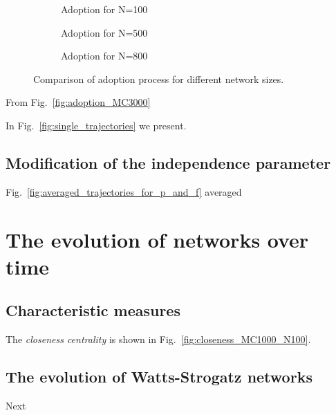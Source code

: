 \documentclass[a4paper,12pt,twoside]{report} %
\begin{document}
\begin{figure}[H]
\centering
	\begin{subfigure}[b]{0.49\textwidth}
           \centering
            \caption{Adoption for N=100}   
            \label{fig:adoption_N100_MC1000}
        \end{subfigure}
        \hfill  
        \begin{subfigure}[b]{0.49\textwidth}   
            \centering 
            \caption{Adoption for N=500}   
            \label{fig:adoption_N500_MC1000}
        \end{subfigure}
        \begin{subfigure}[b]{0.5\textwidth}   
            \centering 
            \caption{Adoption for N=800}   
            \label{fig:adoption_N800_MC1000}
        \end{subfigure}
	\caption{Comparison of adoption process for different network sizes.}   
    \label{fig:adoption_diff_N_MC1000}
\end{figure}


From Fig.~\ref{fig:adoption_MC3000} 

In Fig.~\ref{fig:single_trajectories} we present. 

\subsection{Modification of the independence parameter}
Fig.~\ref{fig:averaged_trajectories_for_p_and_f} averaged 


\section{The evolution of networks over time}
\subsection{Characteristic measures} %

The \textit{closeness centrality} is shown in Fig.~\ref{fig:closeness_MC1000_N100}. 


\subsection{The evolution of Watts-Strogatz networks}
Next
     
\end{document}
